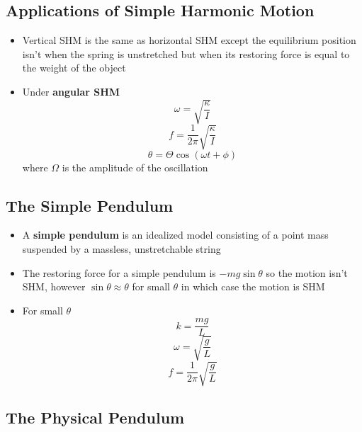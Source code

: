 \documentclass{article}
\begin{document}
\subsection{Applications of Simple Harmonic Motion}

\begin{itemize}
  \item Vertical SHM is the same as horizontal SHM except the equilibrium position isn't when the spring is unstretched but when its restoring force is equal to the weight of the object

  \item Under \textbf{angular SHM} \[\omega=\sqrt{\frac{\kappa}{I}}\] \[f=\frac{1}{2\pi}\sqrt{\frac{\kappa}{I}}\] \[\theta=\Theta\cos(\omega t+\phi)\] where $\Omega$ is the amplitude of the oscillation
\end{itemize}

\subsection{The Simple Pendulum}

\begin{itemize}
  \item A \textbf{simple pendulum} is an idealized model consisting of a point mass suspended by a massless, unstretchable string

  \item The restoring force for a simple pendulum is $-mg\sin\theta$ so the motion isn't SHM, however $\sin\theta \approx \theta$ for small $\theta$ in which case the motion is SHM

  \item For small $\theta$ \[k = \frac{mg}{L}\] \[\omega = \sqrt{\frac{g}{L}}\] \[f = \frac{1}{2\pi} \sqrt{\frac{g}{L}}\]
\end{itemize}

\subsection{The Physical Pendulum}
\end{document}
